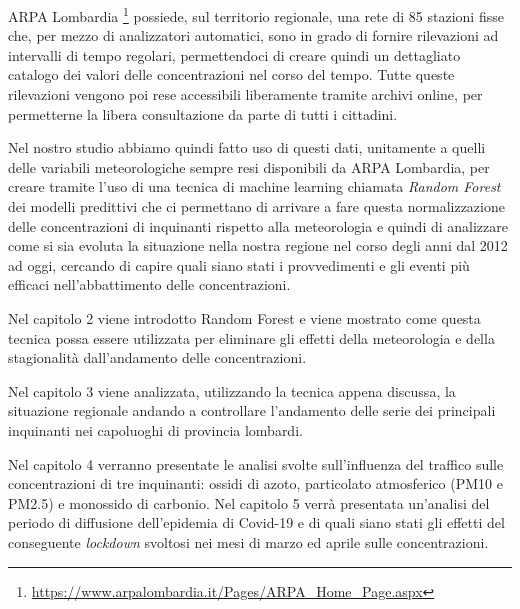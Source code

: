 \documentclass[a4paper]{report}
\begin{document}
ARPA Lombardia \footnote{\url{https://www.arpalombardia.it/Pages/ARPA_Home_Page.aspx}}
possiede, sul territorio regionale, una rete di 85 stazioni fisse che, per mezzo di analizzatori automatici, sono in grado di fornire rilevazioni ad intervalli di tempo regolari, permettendoci di creare quindi un dettagliato catalogo dei valori delle concentrazioni nel corso del tempo. Tutte queste rilevazioni vengono poi rese accessibili liberamente tramite archivi online, per permetterne la libera consultazione da parte di tutti i cittadini.  

Nel nostro studio abbiamo quindi fatto uso di questi dati, unitamente a quelli delle variabili meteorologiche sempre resi disponibili da ARPA Lombardia, per creare tramite l'uso di una tecnica di machine learning chiamata \textit{Random Forest} \cite{breiman2001random}
 dei modelli predittivi che ci permettano di arrivare a fare questa normalizzazione delle concentrazioni di inquinanti rispetto alla meteorologia e quindi di analizzare come si sia evoluta la situazione nella nostra regione nel corso degli anni dal 2012 ad oggi, cercando di capire quali siano stati i provvedimenti e gli eventi più efficaci nell'abbattimento delle concentrazioni.  

Nel capitolo 2 viene introdotto Random Forest e viene mostrato come questa tecnica possa essere utilizzata per eliminare gli effetti della meteorologia e della stagionalità dall'andamento delle concentrazioni.  

Nel capitolo 3 viene analizzata, utilizzando la tecnica appena discussa, la situazione regionale andando a controllare l'andamento delle serie dei principali inquinanti nei capoluoghi di provincia lombardi.  

Nel capitolo 4 verranno presentate le analisi svolte sull'influenza del traffico sulle concentrazioni di tre inquinanti: ossidi di azoto, particolato atmosferico (PM10 e PM2.5) e monossido di carbonio.
Nel capitolo 5 verrà presentata un'analisi del periodo di diffusione dell'epidemia di Covid-19 e di quali siano stati gli effetti del conseguente \textit{lockdown} svoltosi nei mesi di marzo ed aprile sulle concentrazioni.
\end{document}
